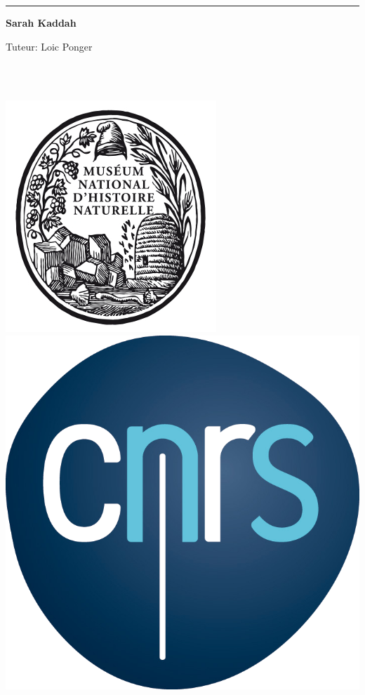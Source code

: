 \documentclass[12pt,a4paper]{article}
\newcommand{\HRule}{\rule{\linewidth}{0.5mm}}
\begin{document}
\begin{titlepage}
\begin{sffamily}
\begin{center}
    \HRule %
\begin{center}\LARGE{\textbf{Sarah Kaddah}}\end{center}
\begin{center}\Large{Tuteur: Loic Ponger}\end{center}~\\[0.5cm]
\\[1cm]
	\begin{center}
		\includegraphics[scale=0.2]{img/mnhn.jpg} \hfill
		\includegraphics[scale=0.08]{img/cnrs.png} \hfill

\end{center}
\end{center}
\end{sffamily}
\end{titlepage}
\end{document}
